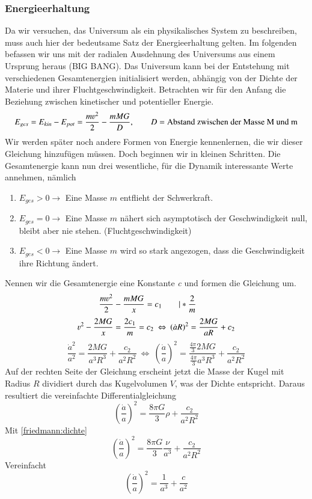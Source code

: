 \begin{refsection}
\subsubsection{Energieerhaltung}
Da wir versuchen, das Universum als ein physikalisches System zu beschreiben, muss auch hier der bedeutsame Satz der Energieerhaltung gelten. Im folgenden befassen wir uns mit der radialen Ausdehnung des Universums aus einem Ursprung heraus (BIG BANG). Das Universum kann bei der Entstehung mit verschiedenen Gesamtenergien initialisiert werden, abhängig von der Dichte der Materie und ihrer Fluchtgeschwindigkeit. Betrachten wir für den Anfang die Beziehung zwischen kinetischer und potentieller Energie.
\begin{equation}
E_{ges} = E_{kin} - E_{pot} =  \frac{m \varv^2}{2} - \frac{m M G }{D}, \qquad D = \text{Abstand zwischen der Masse M und m}
\end{equation}
Wir werden später noch andere Formen von Energie kennenlernen, die wir dieser Gleichung hinzufügen müssen. Doch beginnen wir in kleinen Schritten. Die Gesamtenergie kann nun drei wesentliche, für die Dynamik interessante Werte annehmen, nämlich
\begin{enumerate}
	\item $E_{ges} > 0 \rightarrow$ Eine Masse $m$ entflieht der Schwerkraft.
	\item $E_{ges} = 0 \rightarrow$ Eine Masse $m$ nähert sich asymptotisch  der Geschwindigkeit null, bleibt aber nie stehen. (Fluchtgeschwindigkeit)
	\item $E_{ges} < 0 \rightarrow$ Eine Masse $m$ wird so stark angezogen, dass die Geschwindigkeit ihre Richtung ändert.
\end{enumerate}
Nennen wir die Gesamtenergie eine Konstante \textit{c} und formen die Gleichung um.
\[\frac{m \varv^2}{2} - \frac{m M G}{x} = c_1 \qquad| *\frac{2}{m} \qquad \]
\[{\varv^2} - \frac{2 M G}{x} = \frac{2c_1}{m} = c_2
\:  \Leftrightarrow \: \left( \dot{a} R\right)^2 = \frac{2 M G}{a R} + c_2\] 
\[\frac{\dot{a}^2}{a^2} = \frac{2 M G}{a^3 R^3} + \frac{c_2}{a^2 R^2} \: \Leftrightarrow \: \left(\frac{\dot{a}}{a} \right)^2 = \frac{\frac{4 \pi}{3}2 M G}{\frac{4 \pi}{3} a^3 R^3} + \frac{c_2}{a^2 R^2} \] %
Auf der rechten Seite der Gleichung erscheint jetzt die Masse der Kugel mit Radius $R$ dividiert durch das Kugelvolumen $V$, was der Dichte entspricht. Daraus resultiert die vereinfachte Differentialgleichung 
\begin{equation}
\left(\frac{\dot{a}}{a} \right)^2 = \frac{8 \pi G}{3} \rho + \frac{c_2}{a^2 R^2}
\label{friedmann:EnergieerhaltungUniversum}
\end{equation}
Mit \ref{friedmann:dichte}
\[
\left(\frac{\dot{a}}{a} \right)^2 = \frac{8 \pi G}{3} \frac{\nu}{a^3} + \frac{c_2}{a^2 R^2}
\]
Vereinfacht
\begin{equation}
\left(\frac{\dot{a}}{a} \right)^2 = \frac{1}{a^3} + \frac{c}{a^2}
\end{equation}


\end{refsection}
